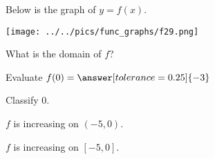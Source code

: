 \documentclass{ximera}
\author{Lee Wayand}
\begin{document}
\begin{exercise}  





Below is the graph of $y=f(x)$.  

\begin{image}
\texttt{[image: ../../pics/func\_graphs/f29.png]}
\end{image}


\begin{question} 

What is the domain of $f$?


\begin{multipleChoice}
\choice {$[-5, 0) \cup (0, 4)$}
\choice [correct]{$[-5, 4)$}
\choice {$(-\infty, \infty)$}
\end{multipleChoice}

\end{question}





\begin{question} 


Evaluate $f(0) = \answer[tolerance=0.25]{-3}$


Classify $0$. \\


\begin{multipleChoice}
\end{multipleChoice}



\end{question}










\begin{question} 


$f$ is increasing on $(-5, 0)$. \\


\begin{multipleChoice}
\end{multipleChoice}




$f$ is increasing on $[-5, 0]$. \\


\begin{multipleChoice}
\end{multipleChoice}






\end{question}
\end{exercise}
\end{document}
